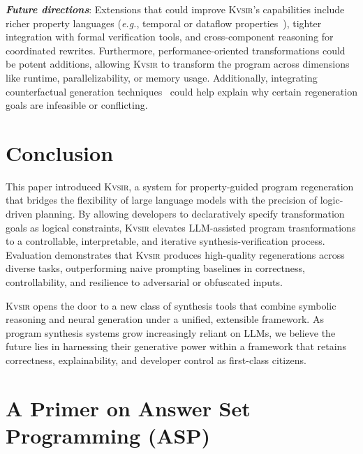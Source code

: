 \documentclass[noacm,sigplan,review]{acmart}
\def\eg{{\em e.g.}, }
\newcommand{\sys}{{\scshape Kv{\textalpha}sir}\xspace}
\newcommand{\heading}[1]{\vspace{2pt}\noindent\textbf{\emph{#1}}:\enspace}
\begin{document}
\heading{Future directions}
Extensions that could improve \sys's capabilities include richer property languages (\eg temporal or dataflow properties~\cite{azzopardi2023ltl,handa2021orderawaredataflowmodelparallel}), tighter integration with formal verification tools, and cross-component reasoning for coordinated rewrites.
Furthermore, performance-oriented transformations could be potent additions, allowing \sys to transform the program across dimensions like runtime, parallelizability, or memory usage.
Additionally, integrating counterfactual generation techniques~\cite{Cabalar_2020} could help explain why certain regeneration goals are infeasible or conflicting.


\section{Conclusion}
This paper introduced \sys, a system for property-guided program regeneration
that bridges the flexibility of large language models with the precision of
logic-driven planning.
By allowing developers to declaratively specify
transformation goals as logical constraints, \sys elevates LLM-assisted program
trasnformations to a controllable, interpretable, and iterative synthesis-verification
process.
Evaluation demonstrates that \sys produces high-quality regenerations
across diverse tasks, outperforming naive prompting baselines in correctness,
controllability, and resilience to adversarial or obfuscated inputs.

\sys opens the door to a new class of synthesis tools that combine symbolic
reasoning and neural generation under a unified, extensible framework.
As program synthesis systems grow increasingly reliant on LLMs, we believe the
future lies in harnessing their generative power within a framework that retains
correctness, explainability, and developer control as first-class citizens.





\appendix

\section{A Primer on Answer Set Programming (ASP)}
\label{sec:asp}
\end{document}
